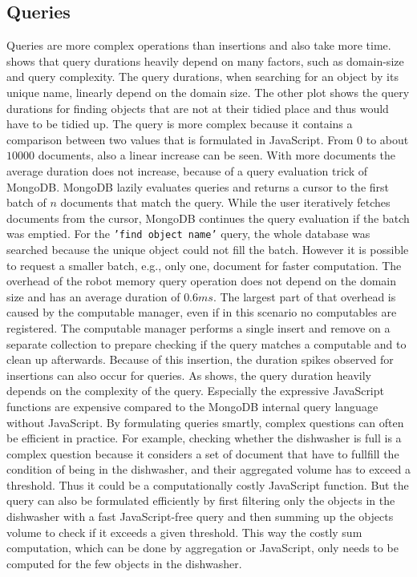 \subsection{Queries}
\label{sec:queries}
Queries are more complex operations than insertions and also take more
time.  shows that query durations heavily
depend on many factors, such as domain-size and query complexity. The
query durations, when searching for an object by its unique name,
linearly depend on the domain size. The other plot shows the query
durations for finding objects that are not at their tidied place
and thus would have to be tidied up. The query is more complex
because it contains a comparison between two values that is formulated
in JavaScript. From $0$ to about $10000$ documents, also a linear
increase can be seen. With more documents the average duration does
not increase, because of a query evaluation trick of MongoDB. MongoDB
lazily evaluates queries and returns a cursor to the first batch of
$n$ documents that match the query. While the user iteratively fetches
documents from the cursor, MongoDB continues the query evaluation if
the batch was emptied. For the \texttt{'find object name'} query, the whole
database was searched because the unique object could not fill the
batch. However it is possible to request a smaller batch, e.g., only
one, document for faster computation.   The overhead of the robot memory query operation does not
depend on the domain size and has an average duration of $0.6ms$. The
largest part of that overhead is caused by the computable manager,
even if in this scenario no computables are registered. The computable
manager performs a single insert and remove on a separate collection
to prepare checking if the query matches a computable and to clean up
afterwards. Because of this insertion, the duration spikes observed
for insertions can also occur for queries. As 
shows, the query duration heavily depends on the complexity of the
query. Especially the expressive JavaScript functions are expensive
compared to the MongoDB internal query language without JavaScript. By
formulating queries smartly, complex questions can often be
efficient in practice. For example, checking whether the dishwasher
is full is a complex question because it considers a set of document
that have to fullfill the condition of being in the dishwasher, and
their aggregated volume has to exceed a threshold. Thus it could be a
computationally costly JavaScript function. But the query can also be formulated efficiently
by first filtering only the objects in the dishwasher with a fast
JavaScript-free query and then summing up the objects volume to check
if it exceeds a given threshold. This way the costly sum computation,
which can be done by aggregation or JavaScript, only needs to be
computed for the few objects in the dishwasher.

